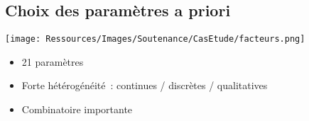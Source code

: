 \documentclass[xcolor=x11names, compress, 11pt]{beamer}
\begin{document}
\subsection{Choix des paramètres a priori}
\begin{frame}[c]
    \vfill
    \centering
    \texttt{[image: Ressources/Images/Soutenance/CasEtude/facteurs.png]}
    \vfill
    \begin{itemize}
        \item \num{21} paramètres
        \item Forte hétérogénéité~: continues / discrètes / qualitatives
        \item Combinatoire importante
    \end{itemize}

\end{frame}


\end{document}
